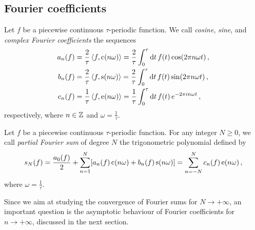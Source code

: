 \subsection{Fourier coefficients}
\begin{definition}
	\label{def:fourier-coef}
	Let $f$ be a piecewise continuous $\tau$-periodic function. We call \emph{cosine},
	\emph{sine}, and \emph{complex Fourier coefficients} the sequences
	\begin{align}
		a_n(f) & =\frac{2}{\tau}\braket{f,\operatorname{c}(n\omega)}
		=\frac{2}{\tau}\int_0^{\tau}\mathrm{d} t\,f(t)\cos(2\pi n\omega t)\,,
		\label{eq:fourier-an}                           \\
		b_n(f) & =\frac{2}{\tau}\braket{f,\operatorname{s}(n\omega)}
		=\frac{2}{\tau}\int_0^{\tau}\mathrm{d} t\,f(t)\sin(2\pi n\omega t)\,,
		\label{eq:fourier-bn}                           \\
		c_n(f) & =\frac{1}{\tau}\braket{f,\operatorname{e}(n\omega)}
		=\frac{1}{\tau}\int_0^{\tau}\mathrm{d} t\,f(t)\,e^{-2\pi i n\omega t}\,,
		\label{eq:fourier-cn}
	\end{align}
	respectively, where $n\in\mathbb{Z}$ and $\omega=\frac{1}{\tau}$.
\end{definition}
\begin{definition}
	\label{def:fourier-partial}
	Let $f$ be a piecewise continuous $\tau$-periodic function. For any integer $N\geq 0$,
	we call \emph{partial Fourier sum} of degree $N$ the trigonometric polynomial defined by
	\begin{equation}
		s_N(f)=\frac{a_0(f)}{2}+\sum_{n=1}^N[a_n(f)\operatorname{c}(n\omega)+b_n(f)\operatorname{s}(n\omega)]=
		\sum_{n=-N}^{N}c_n(f)\operatorname{e}(n\omega)\,,
	\end{equation}
	where $\omega=\frac{1}{\tau}$.
\end{definition}
Since we aim at studying the convergence of Fourier sums for $N\to+\infty$, an important
question is the asymptotic behaviour of Fourier coefficients for $n\to+\infty$, discussed
in the next section.
